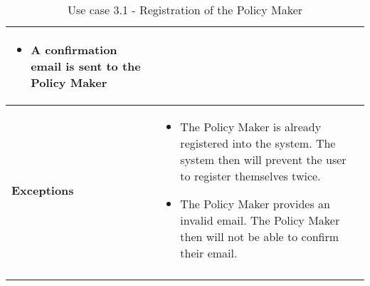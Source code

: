 \begin{longtable}[H]{ | l | p{10cm} | }
\begin{itemize}
    \item A confirmation email is sent to the Policy Maker
\end{itemize}
\\ \hline
{\cellcolor[rgb]{0.753,0.753,0.753}}\textbf{Exceptions} &
\begin{itemize}
    \item The Policy Maker is already registered into the system. The system then will prevent the user to register themselves twice.
    \item The Policy Maker provides an invalid email. The Policy Maker then will not be able to confirm their email.
\end{itemize}
\\ \hline
\caption{Use case 3.1 - Registration of the Policy Maker}
\\
\end{longtable}